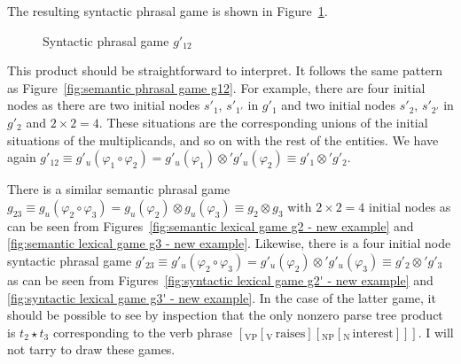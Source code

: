 The resulting syntactic phrasal game is shown in Figure~\ref{fig:syntactic phrasal game g12'}.

\begin{figure}[p] 

\caption{Syntactic phrasal game $g'_{12}$}
\label{fig:syntactic phrasal game g12'}
\end{figure}

This product should be straightforward to interpret. It follows the same pattern as Figure~\ref{fig:semantic phrasal game g12}. For example, there are four initial nodes as there are two initial nodes $s'_1$, $s'_{1'}$ in $g'_1$ and two initial nodes $s'_2$, $s'_{2'}$ in $g'_2$ and $2 \times 2 = 4$. These situations are the corresponding unions of the initial situations of the multiplicands, and so on with the rest of the entities. We have again $g'_{12} \equiv g'_u(\varphi_1 \circ \varphi_2) = g'_u(\varphi_1) \otimes' g'_u(\varphi_2) \equiv g'_1 \otimes' g'_2$.

There is a similar semantic phrasal game $g_{23} \equiv g_u(\varphi_2 \circ \varphi_3) = g_u(\varphi_2) \otimes g_u(\varphi_3) \equiv g_2 \otimes g_3$ with $2 \times 2 = 4$ initial nodes as can be seen from Figures~\ref{fig:semantic lexical game g2 - new example} and \ref{fig:semantic lexical game g3 - new example}. Likewise, there is a four initial node syntactic phrasal game $g'_{23} \equiv g'_u(\varphi_2 \circ \varphi_3) = g'_u(\varphi_2) \otimes' g'_u(\varphi_3) \equiv g'_2 \otimes' g'_3$ as can be seen from Figures~\ref{fig:syntactic lexical game g2' - new example} and \ref{fig:syntactic lexical game g3' - new example}. In the case of the latter game, it should be possible to see by inspection that the only nonzero parse tree product is $t_2 \star t_3$ corresponding to the verb phrase $[_{\mathrm{VP}}[_{\mathrm{V}}\,\mathrm{raises}][_{\mathrm{NP}}[_{\mathrm{N}}\,\mathrm{interest}]]]$. I will not tarry to draw these games.

